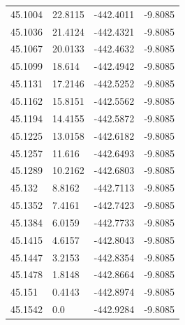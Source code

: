 \begin{table}[H]
\begin{tabular}{llll}
45.1004 & 22.8115 & -442.4011 & -9.8085 \\
45.1036 & 21.4124 & -442.4321 & -9.8085 \\
45.1067 & 20.0133 & -442.4632 & -9.8085 \\
45.1099 & 18.614 & -442.4942 & -9.8085 \\
45.1131 & 17.2146 & -442.5252 & -9.8085 \\
45.1162 & 15.8151 & -442.5562 & -9.8085 \\
45.1194 & 14.4155 & -442.5872 & -9.8085 \\
45.1225 & 13.0158 & -442.6182 & -9.8085 \\
45.1257 & 11.616 & -442.6493 & -9.8085 \\
45.1289 & 10.2162 & -442.6803 & -9.8085 \\
45.132 & 8.8162 & -442.7113 & -9.8085 \\
45.1352 & 7.4161 & -442.7423 & -9.8085 \\
45.1384 & 6.0159 & -442.7733 & -9.8085 \\
45.1415 & 4.6157 & -442.8043 & -9.8085 \\
45.1447 & 3.2153 & -442.8354 & -9.8085 \\
45.1478 & 1.8148 & -442.8664 & -9.8085 \\
45.151 & 0.4143 & -442.8974 & -9.8085 \\
45.1542 & 0.0 & -442.9284 & -9.8085 \\
\bottomrule
\end{tabular}

\end{table}
